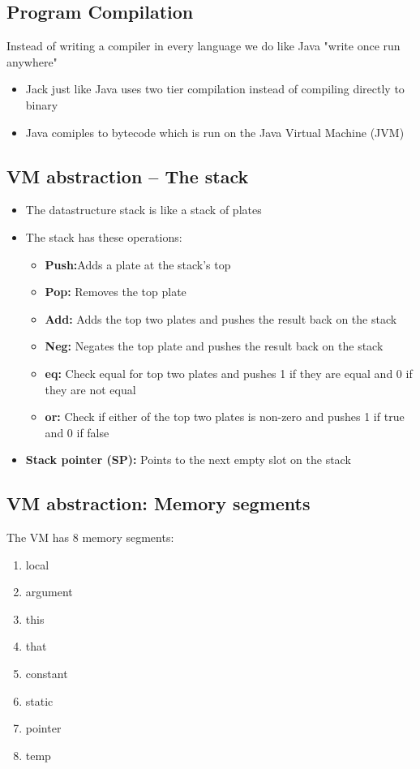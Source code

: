 \documentclass[12pt,a4paper]{article}
\begin{document}
\subsection{Program Compilation}
Instead of writing a compiler in every language we do like Java "write once run anywhere"
\begin{itemize}
    \item Jack just like Java uses two tier compilation instead of compiling directly to binary
    \item Java comiples to bytecode which is run on the Java Virtual Machine (JVM)
\end{itemize}

\subsection{VM abstraction -- The stack}
\begin{itemize}
    \item The datastructure stack is like a stack of plates
    \item The stack has these operations:
    \begin{itemize}
        \item \textbf{Push:}Adds a plate at the stack's top
        \item \textbf{Pop: }Removes the top plate
        \item \textbf{Add: }Adds the top two plates and pushes the result back on the stack
        \item \textbf{Neg: }Negates the top plate and pushes the result back on the stack 
        \item \textbf{eq: }Check equal for top two plates and pushes 1 if they are equal and 0 if they are not equal
        \item \textbf{or: }Check if either of the top two plates is non-zero and pushes 1 if true and 0 if false
    \end{itemize}
    \item \textbf{Stack pointer (SP):} Points to the next empty slot on the stack
\end{itemize}

\subsection{VM abstraction: Memory segments}
The VM has 8 memory segments:
\begin{enumerate}
    \item local
    \item argument
    \item this 
    \item that 
    \item constant 
    \item static 
    \item pointer 
    \item temp
\end{enumerate}
\end{document}
